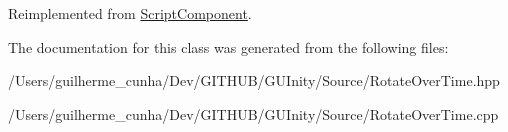 Reimplemented from \hyperlink{class_script_component_aa765fa62a343a8d83eb168d369b93a51}{Script\+Component}.



The documentation for this class was generated from the following files\+:\begin{DoxyCompactItemize}
\item 
/\+Users/guilherme\+\_\+cunha/\+Dev/\+G\+I\+T\+H\+U\+B/\+G\+U\+Inity/\+Source/Rotate\+Over\+Time.\+hpp\item 
/\+Users/guilherme\+\_\+cunha/\+Dev/\+G\+I\+T\+H\+U\+B/\+G\+U\+Inity/\+Source/Rotate\+Over\+Time.\+cpp\end{DoxyCompactItemize}
